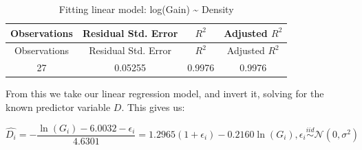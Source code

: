 \documentclass[]{article}
\begin{document}
\begin{longtable}[]{@{}cccc@{}}
\caption{Fitting linear model: log(Gain) \textasciitilde{}
Density}\tabularnewline
\toprule
\begin{minipage}[b]{0.18\columnwidth}\centering\strut
Observations\strut
\end{minipage} & \begin{minipage}[b]{0.27\columnwidth}\centering\strut
Residual Std. Error\strut
\end{minipage} & \begin{minipage}[b]{0.11\columnwidth}\centering\strut
\(R^2\)\strut
\end{minipage} & \begin{minipage}[b]{0.20\columnwidth}\centering\strut
Adjusted \(R^2\)\strut
\end{minipage}\tabularnewline
\midrule
\endfirsthead
\toprule
\begin{minipage}[b]{0.18\columnwidth}\centering\strut
Observations\strut
\end{minipage} & \begin{minipage}[b]{0.27\columnwidth}\centering\strut
Residual Std. Error\strut
\end{minipage} & \begin{minipage}[b]{0.11\columnwidth}\centering\strut
\(R^2\)\strut
\end{minipage} & \begin{minipage}[b]{0.20\columnwidth}\centering\strut
Adjusted \(R^2\)\strut
\end{minipage}\tabularnewline
\midrule
\endhead
\begin{minipage}[t]{0.18\columnwidth}\centering\strut
27\strut
\end{minipage} & \begin{minipage}[t]{0.27\columnwidth}\centering\strut
0.05255\strut
\end{minipage} & \begin{minipage}[t]{0.11\columnwidth}\centering\strut
0.9976\strut
\end{minipage} & \begin{minipage}[t]{0.20\columnwidth}\centering\strut
0.9976\strut
\end{minipage}\tabularnewline
\bottomrule
\end{longtable}

From this we take our linear regression model, and invert it, solving
for the known predictor variable \(D\). This gives us:

\[
  \hat{D_{i}} = 
  -\frac{\ln(G_{i}) - 6.0032 - \epsilon_{i}}{4.6301} =
  1.2965(1+\epsilon_{i}) - 0.2160\ln(G_{i}),
  \epsilon_{i} \stackrel{iid}{\sim} \mathcal{N}(0,\sigma^{2})
\]
\end{document}
